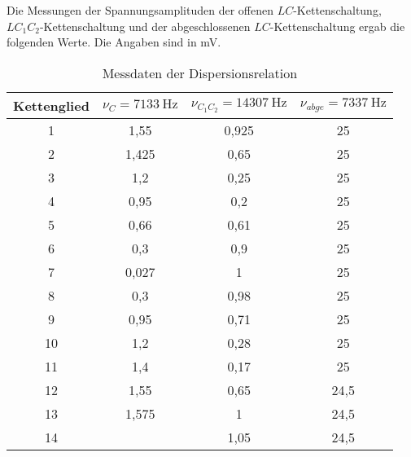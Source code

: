 Die Messungen der Spannungsamplituden der offenen $LC$-Kettenschaltung, $LC_1C_2$-Kettenschaltung
und der abgeschlossenen $LC$-Kettenschaltung ergab die folgenden Werte. Die Angaben sind
in \si{\milli\volt}.

\FloatBarrier
{}
\begin{table}
 \centering
 \begin{tabular}[width=\textwidth]{S[table-format=1.0] S S S[table-format=2.0]}
     \toprule
      {Kettenglied} & {$\nu_C=\SI{7133}{\hertz}$} & {$\nu_{C_1C_2} = \SI{14307}{\hertz}$} & {$\nu_{abge}=\SI{7337}{\hertz}$}\\
      & 1,55 & 0,925 & 25 \\
      2 & 1,425 & 0,65 & 25 \\
      3 & 1,2 & 0,25 & 25 \\
      4 & 0,95 & 0,2 & 25 \\
      5 & 0,66 & 0,61 & 25 \\
      6 & 0,3 & 0,9  & 25 \\
      7 & 0,027 & 1  & 25 \\
      8 & 0,3 & 0,98 & 25  \\
      9 & 0,95& 0,71  & 25 \\
      10 & 1,2 & 0,28 & 25 \\
      11 & 1,4 & 0,17 & 25 \\
      12 & 1,55 & 0,65 & 24,5 \\
      13 & 1,575 & 1 & 24,5 \\
      14 & \text{--} & 1,05 & 24,5 \\
      \bottomrule
\end{tabular}
  \caption{Messdaten der Dispersionsrelation}
  \label{tab:Dispersionsrelation}
\end{table}
